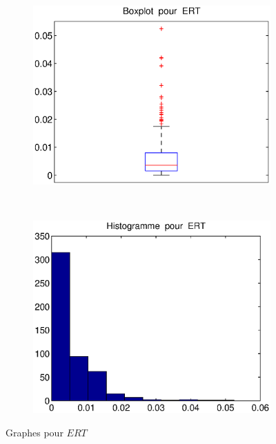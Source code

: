 \begin{figure}[!ht]
        \centering
        \begin{subfigure}[b]{0.4\textwidth}
                \includegraphics[width=\textwidth]{graphes/boxplot_ertmg.eps}
        \end{subfigure}%
        ~ 
        \begin{subfigure}[b]{0.4\textwidth}
                \includegraphics[width=\textwidth]{graphes/hist_ertmg.eps}
        \end{subfigure}
        \caption{Graphes pour $ERT$}\label{fig:ertmg}
\end{figure}

